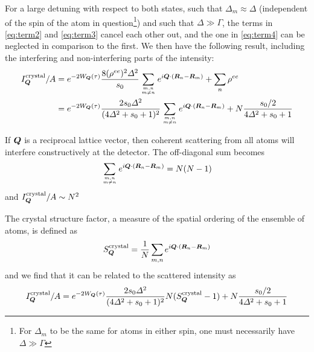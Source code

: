 For a large detuning with respect to both states, such that $\Delta_{m}\approx
\Delta$ (independent of the spin of the atom in question\footnote{ For
$\Delta_{m}$ to be the same for atoms in either spin, one must necessarily have
$\Delta \gg \Gamma $}) and such that $\Delta \gg \Gamma$, the terms in
\ref{eq:term2} and \ref{eq:term3} cancel each other out,  and the one in
\ref{eq:term4} can be neglected in comparison to the first.  We then have the
following result, including the interfering and non-interfering parts of the
intensity: \vspace{1em}
\begin{equation}
\begin{split} 
 I_{\bv{Q}}^{\mathrm{crystal}} / A   
   &  =  
 \debyew
\frac{ 8(\rho^{ee})^{2} \Delta^{2} } { s_{0} }
    \sumOff e^{ i \bv{Q} \cdot ( \bv{R}_{n} - \bv{R}_{m} ) } 
   + \sum_{n} \rho^{ee} \\ 
   &  =  
 \debyew
  \frac{ 2 s_{0} \Delta^{2} } { ( 4\Delta^{2} + s_{0} + 1  )^{2} }
    \sumOff e^{ i \bv{Q} \cdot ( \bv{R}_{n} - \bv{R}_{m} ) } + 
   N \frac{ s_{0}/2}{ 4\Delta^{2} + s_{0} + 1} \\
\end{split}  
\vspace{1em}
\end{equation}

If $\bm{Q}$ is a reciprocal lattice vector, then coherent scattering from all
atoms will interfere constructively at the detector. The off-diagonal sum 
becomes 
\begin{equation}
    \sumOff e^{ i \bv{Q} \cdot ( \bv{R}_{n} - \bv{R}_{m} ) } 
= N(N-1)
\end{equation}
and $I_{\bm{Q}}^{\mathrm{crystal}}/A \sim N^{2} $

The crystal structure factor, a measure of the spatial ordering of the ensemble
of atoms, is defined as 
\begin{equation} 
 S_{\bm{Q}}^{\mathrm{crystal}} = \frac{1}{N} 
  \sum_{m,n} e^{i \bm{Q} \cdot ( \bm{R}_{n} - \bm{R}_{m} ) } 
\end{equation}   
and we find that it can be related to the scattered intensity as 
\begin{equation}
\begin{split} 
 I_{\bm{Q}}^{\mathrm{crystal}} / A   
   &  =  
  e^{-2W_{\bm{Q}}(\tau)} 
  \frac{ 2 s_{0} \Delta^{2} } { ( 4\Delta^{2} + s_{0} + 1 )^{2}  }
   N ( S_{\bm{Q}}^{\mathrm{crystal}} - 1 ) +  
   N \frac{ s_{0}/2}{ 4\Delta^{2} + s_{0} + 1} \\
\end{split}  
\end{equation}


